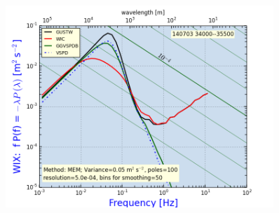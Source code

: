 \documentclass[12pt,twoside,english]{article}\usepackage[]{graphicx}\usepackage[]{color}
\let\OrgIndex\index
\renewcommand*{\index}[1]{\OrgIndex{#1}}
\begin{document}
{{%

\begin{figure}
\noindent \begin{centering}
\includegraphics[width=0.9\textwidth]{SpecialGraphics/WIXHR1.png}  
\par\end{centering}


\end{figure}}}
\end{document}
